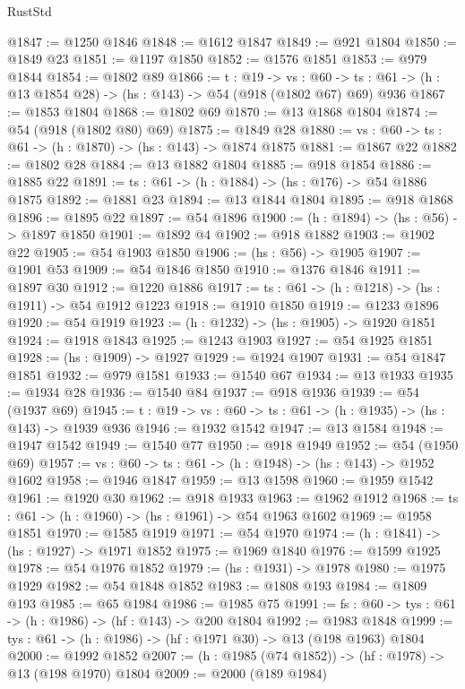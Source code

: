 \begin{lexlean}{RustStd}
\begin{coremodule}
{\begin{coremodule}
{{{{{{{{{{{{{{{{{{{{{{{{{{@1847 := @1250 @1846
@1848 := @1612 @1847
@1849 := @921 @1804
@1850 := @1849 @23
@1851 := @1197 @1850
@1852 := @1576 @1851
@1853 := @979 @1844
@1854 := @1802 @89
@1866 := {t : @19} ->
  {vs : @60} -> {ts : @61} -> (h : @13 @1854 @28) -> (hs : @143) -> @54 (@918 (@1802 @67) @69) @936
@1867 := @1853 @1804
@1868 := @1802 @69
@1870 := @13 @1868 @1804
@1874 := @54 (@918 (@1802 @80) @69)
@1875 := @1849 @28
@1880 := {vs : @60} -> {ts : @61} -> (h : @1870) -> (hs : @143) -> @1874 @1875
@1881 := @1867 @22
@1882 := @1802 @28
@1884 := @13 @1882 @1804
@1885 := @918 @1854
@1886 := @1885 @22
@1891 := {ts : @61} -> (h : @1884) -> (hs : @176) -> @54 @1886 @1875
@1892 := @1881 @23
@1894 := @13 @1844 @1804
@1895 := @918 @1868
@1896 := @1895 @22
@1897 := @54 @1896
@1900 := (h : @1894) -> (hs : @56) -> @1897 @1850
@1901 := @1892 @4
@1902 := @918 @1882
@1903 := @1902 @22
@1905 := @54 @1903 @1850
@1906 := (hs : @56) -> @1905
@1907 := @1901 @53
@1909 := @54 @1846 @1850
@1910 := @1376 @1846
@1911 := @1897 @30
@1912 := @1220 @1886
@1917 := {ts : @61} -> (h : @1218) -> (hs : @1911) -> @54 @1912 @1223
@1918 := @1910 @1850
@1919 := @1233 @1896
@1920 := @54 @1919
@1923 := (h : @1232) -> (hs : @1905) -> @1920 @1851
@1924 := @1918 @1843
@1925 := @1243 @1903
@1927 := @54 @1925 @1851
@1928 := (hs : @1909) -> @1927
@1929 := @1924 @1907
@1931 := @54 @1847 @1851
@1932 := @979 @1581
@1933 := @1540 @67
@1934 := @13 @1933
@1935 := @1934 @28
@1936 := @1540 @84
@1937 := @918 @1936
@1939 := @54 (@1937 @69)
@1945 := {t : @19} -> {vs : @60} -> {ts : @61} -> (h : @1935) -> (hs : @143) -> @1939 @936
@1946 := @1932 @1542
@1947 := @13 @1584
@1948 := @1947 @1542
@1949 := @1540 @77
@1950 := @918 @1949
@1952 := @54 (@1950 @69)
@1957 := {vs : @60} -> {ts : @61} -> (h : @1948) -> (hs : @143) -> @1952 @1602
@1958 := @1946 @1847
@1959 := @13 @1598
@1960 := @1959 @1542
@1961 := @1920 @30
@1962 := @918 @1933
@1963 := @1962 @1912
@1968 := {ts : @61} -> (h : @1960) -> (hs : @1961) -> @54 @1963 @1602
@1969 := @1958 @1851
@1970 := @1585 @1919
@1971 := @54 @1970
@1974 := (h : @1841) -> (hs : @1927) -> @1971 @1852
@1975 := @1969 @1840
@1976 := @1599 @1925
@1978 := @54 @1976 @1852
@1979 := (hs : @1931) -> @1978
@1980 := @1975 @1929
@1982 := @54 @1848 @1852
@1983 := @1808 @193
@1984 := @1809 @193
@1985 := @65 @1984
@1986 := @1985 @75
@1991 := {fs : @60} -> {tys : @61} -> (h : @1986) -> (hf : @143) -> @200 @1804
@1992 := @1983 @1848
@1999 := {tys : @61} -> (h : @1986) -> (hf : @1971 @30) -> @13 (@198 @1963) @1804
@2000 := @1992 @1852
@2007 := (h : @1985 (@74 @1852)) -> (hf : @1978) -> @13 (@198 @1970) @1804
@2009 := @2000 (@189 @1984)
}}}}}}}}}}}}}}}}}}}}}}}}}}
\end{coremodule}}
\end{coremodule}
\end{lexlean}
